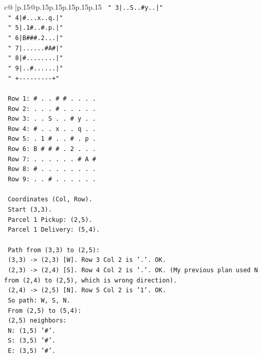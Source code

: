 \documentclass{article}
\begin{document}
{\begin{supertabular}{c@{$\;$}|p{.15\linewidth}@{}p{.15\linewidth}p{.15\linewidth}p{.15\linewidth}p{.15\linewidth}p{.15\linewidth}}
{{{\texttt{  " 3|..S..\#y..|"} \\
\texttt{  " 4|\#...x..q.|"} \\
\texttt{  " 5|.1\#..\#.p.|"} \\
\texttt{  " 6|B\#\#\#.2...|"} \\
\texttt{  " 7|......\#A\#|"} \\
\texttt{  " 8|\#........|"} \\
\texttt{  " 9|..\#......|"} \\
\texttt{  "  +{-}{-}{-}{-}{-}{-}{-}{-}{-}+"} \\
\\ 
\texttt{  Row 1: \# . . \# \# . . . .} \\
\texttt{  Row 2: . . . \# . . . . .} \\
\texttt{  Row 3: . . S . . \# y . .} \\
\texttt{  Row 4: \# . . x . . q . .} \\
\texttt{  Row 5: . 1 \# . . \# . p .} \\
\texttt{  Row 6: B \# \# \# . 2 . . .} \\
\texttt{  Row 7: . . . . . . \# A \#} \\
\texttt{  Row 8: \# . . . . . . . .} \\
\texttt{  Row 9: . . \# . . . . . .} \\
\\ 
\texttt{  Coordinates (Col, Row).} \\
\texttt{  Start (3,3).} \\
\texttt{  Parcel 1 Pickup: (2,5).} \\
\texttt{  Parcel 1 Delivery: (5,4).} \\
\\ 
\texttt{  Path from (3,3) to (2,5):} \\
\texttt{  (3,3) {-}> (2,3) {[}W{]}. Row 3 Col 2 is '.'. OK.} \\
\texttt{  (2,3) {-}> (2,4) {[}S{]}. Row 4 Col 2 is '.'. OK. (My previous plan used N from (2,4) to (2,5), which is wrong direction).} \\
\texttt{  (2,4) {-}> (2,5) {[}N{]}. Row 5 Col 2 is '1'. OK.} \\
\texttt{  So path: W, S, N.} \\
\texttt{  From (2,5) to (5,4):} \\
\texttt{  (2,5) neighbors:} \\
\texttt{  N: (1,5) '\#'.} \\
\texttt{  S: (3,5) '\#'.} \\
\texttt{  E: (3,5) '\#'.} \\
}}}
\end{supertabular}}
\end{document}
